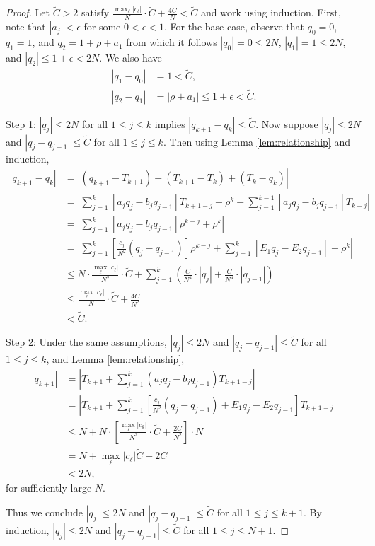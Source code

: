 \documentclass{amsart}
\theoremstyle{remark}
\theoremstyle{definition}
\newcommand{\lp}{\left(}
\newcommand{\rp}{\right)}
\newcommand{\lb}{\left[}
\newcommand{\rb}{\right]}
\begin{document}
\begin{proof}
    Let $\tilde{C}>2$ satisfy $\frac{\max_\ell |c_\ell|}{N}\cdot \tilde{C} + \frac{4C}{N}<\tilde{C}$ and work using induction. 
    First, note that $|a_j|<\epsilon$ for some $0<\epsilon<1$.
    For the base case, observe that $q_0= 0$, $q_1=1$, and $q_2=1+\rho+a_1$ from which it follows $|q_0|=0\leq 2N$, $|q_1|=1\leq 2N$, and $|q_2|\leq 1+\epsilon < 2N$.
    We also have 
    \begin{align*}
        |q_1-q_0| &= 1 < \tilde{C}, \\
        |q_2-q_1| &= | \rho+a_1| \leq 1 + \epsilon < \tilde{C}.
    \end{align*}

    Step 1: $|q_j|\leq 2N$ for all $1\leq j\leq k$ implies $|q_{k+1}-q_k|\leq \tilde{C}$.
    Now suppose $|q_j|\leq 2N$ and $|q_j-q_{j-1}|\leq \tilde{C}$ for all $1\leq j\leq k$.
    Then using Lemma \ref{lem:relationship} and induction,
    \begin{align*}
        |q_{k+1}-q_k| 
        &= |(q_{k+1}-T_{k+1}) + (T_{k+1}-T_k) + (T_k - q_k)| \\
        &= \left| \sum_{j=1}^k [a_jq_j-b_jq_{j-1}]T_{k+1-j} + \rho^k - \sum_{j=1}^{k-1} [a_jq_j-b_jq_{j-1}]T_{k-j} \right| \\
        &= \left| \sum_{j=1}^k[a_jq_j-b_jq_{j-1}] \rho^{k-j} + \rho^k \right| \\
        &= \left| \sum_{j=1}^k \lb \frac{c_j}{N^2} (q_j-q_{j-1}) \rb\rho^{k-j} + \sum_{j=1}^k [E_1q_j - E_2 q_{j-1}] +\rho^k \right| \\
        &\leq N \cdot \frac{\max_\ell|c_\ell|}{N^2}\cdot \tilde{C} + \sum_{j=1}^k\lp \frac{C}{N^4}\cdot |q_j| + \frac{C}{N^4}\cdot |q_{j-1}| \rp \\
        &\leq \frac{\max_\ell |c_\ell|}{N}\cdot \tilde{C} + \frac{4C}{N^2} \\
        &< \tilde{C}.
    \end{align*}

    Step 2: 
    Under the same assumptions, $|q_j|\leq 2N$ and $|q_j-q_{j-1}|\leq \tilde{C}$ for all $1\leq j\leq k$, and Lemma \ref{lem:relationship},
    \begin{align*}
        |q_{k+1}| &= \left|T_{k+1} + \sum_{j=1}^k(a_jq_j-b_jq_{j-1}) T_{k+1-j} \right| \\
        &= \left| T_{k+1} + \sum_{j=1}^k \lb\frac{ c_j}{N^2}(q_j-q_{j-1}) + E_1q_j - E_2 q_{j-1} \rb T_{k+1-j} \right| \\
        &\leq N + N\cdot \lb \frac{  \max_\ell|c_k|}{N^2}\cdot\tilde{C} + \frac{2C}{N^2} \rb\cdot N \\
        &= N + \max_\ell|c_\ell| \tilde{C} + 2C \\
        &< 2N,
    \end{align*}
    for sufficiently large $N$.

    Thus we conclude $|q_j|\leq 2N$ and $|q_j-q_{j-1}|\leq \tilde{C}$ for all $1\leq j\leq k+1$.
    By induction, $|q_j|\leq 2N$ and $|q_j-q_{j-1}|\leq \tilde{C}$ for all $1\leq j\leq N+1$.
\end{proof}
\end{document}
